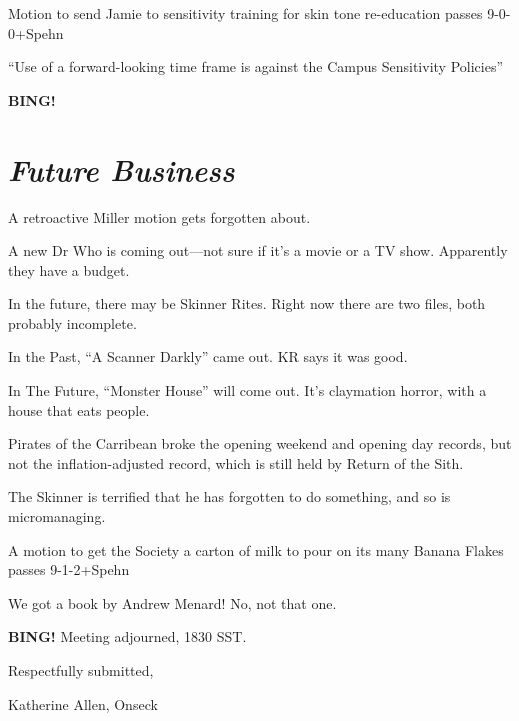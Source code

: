\documentclass[10pt]{article}
\newcommand{\bing}{{\bf BING!} }
\newcommand{\goto}[1]{\bing \vskip 12pt \section*{{\em{#1}}}}
\begin{document}
Motion to send Jamie to sensitivity training for skin tone
re-education passes 9-0-0+Spehn

``Use of a forward-looking time frame is against the Campus
Sensitivity Policies''

\goto{Future Business}
A retroactive Miller motion gets forgotten about.

A new Dr Who is coming out---not sure if it's a movie or a TV
show. Apparently they have a budget.

In the future, there may be Skinner Rites. Right now there are two
files, both probably incomplete.

In the Past, ``A Scanner Darkly'' came out. KR says it was good.

In The Future, ``Monster House'' will come out. It's claymation
horror, with a house that eats people.

Pirates of the Carribean broke the opening weekend and opening day
records, but not the inflation-adjusted record, which is still held by
Return of the Sith.

The Skinner is terrified that he has forgotten to do something, and so
is micromanaging.

A motion to get the Society a carton of milk to pour on its many
Banana Flakes passes 9-1-2+Spehn

We got a book by Andrew Menard! No, not that one.

\bing
\noindent
Meeting adjourned, 1830 SST.

\vspace{18pt}

\centerline{Respectfully submitted,}
\centerline{Katherine Allen, Onseck}
\end{document}
